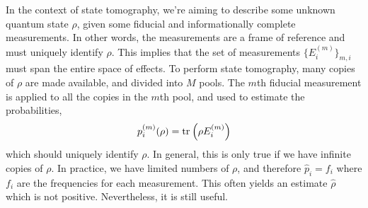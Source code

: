 In the context of state tomography, we're aiming to describe some unknown quantum state $\rho$,
given some fiducial and informationally complete measurements. In other words, the measurements are
a frame of reference and must uniquely identify $\rho$. This implies that the set of measurements
$\{E_i^{(m)}\}_{m,i}$ must span the entire space of effects. To perform state tomography, many
copies of $\rho$ are made available, and divided into $M$ pools. The $m$th fiducial measurement is
applied to all the copies in the $m$th pool, and used to estimate the probabilities,
\begin{equation}
    p_i^{(m)} (\rho) = \text{tr}_{}\left(\rho E_i^{(m)}\right)
\end{equation}
which should uniquely identify $\rho$. In general, this is only true if we have infinite copies of
$\rho$. In practice, we have limited numbers of $\rho$, and therefore $\hat{p}_i = f_i$ where $f_i$
are the frequencies for each measurement. This often yields an estimate $\hat{\rho}$ which is not
positive. Nevertheless, it is still useful.

